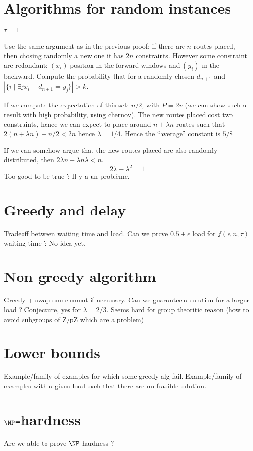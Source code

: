 \documentclass[10pt, conference, letterpaper]{IEEEtran}
\begin{document}
\section{Algorithms for random instances}

\paragraph{$\tau = 1$}

Use the same argument as in the previous proof: 
if there are $n$ routes placed, then chosing randomly a new one 
it has $2n$ constraints. However some constraint are redondant:
$(x_i)$ position in the forward windows and $(y_i)$ in the backward.
Compute the probability that for a randomly chosen $d_{n+1}$ and  
$|\{i \mid \exists j x_i+d_{n+1} = y_j\}|>k$.

If we compute the expectation of this set: 
$n/2$, with $P=2n$ (we can show such a result with high probability, using chernov). The new routes placed cost two constraints, hence we can expect to place around $n + \lambda n$ routes such that $2(n + \lambda n) -n/2 < 2n $ hence $\lambda = 1/4$. 
Hence the ``average'' constant is $5/8$

If we can somehow argue that the new routes placed are also randomly distributed, then
$2 \lambda n - \lambda n \lambda < n$. 
$$ 2\lambda - \lambda ^2 = 1$$
Too good to be true ? Il y a un problème.

\section{Greedy and delay}

Tradeoff between waiting time and load. Can we prove $0.5 + \epsilon$ load for $f(\epsilon,n,\tau)$ waiting time ?  No idea yet.


\section{Non greedy algorithm}

Greedy + swap one element if necessary. 
Can we guarantee a solution for a larger load ? Conjecture, yes for $\lambda = 2/3$. 
Seems hard for group theoritic reason (how to avoid subgroups of Z/pZ which are a problem)

\section{Lower bounds}

Example/family of examples for which some greedy alg fail.
Example/family of examples with a given load such that there are no feasible solution.

\section{$\NP$-hardness}

Are we able to prove $\NP$-hardness ?

% 
% 
\end{document}
